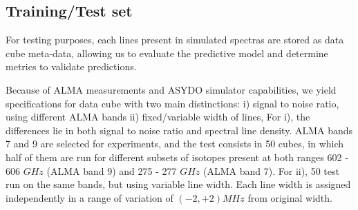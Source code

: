 \subsection{Training/Test set}
For testing purposes, each lines present in simulated spectras are stored as data cube meta-data, allowing us to evaluate the predictive model and determine metrics to validate predictions.

Because of ALMA measurements and ASYDO simulator capabilities, we yield specifications for data cube with two main distinctions:
i) signal to noise ratio, using different ALMA bands
ii) fixed/variable width of lines, 
For i), the differences lie in both signal to noise ratio and spectral line density.
ALMA bands 7 and 9 are selected for experiments, and the test consists in 50 cubes, in which half of them are run for different subsets of isotopes present at both ranges 602 - 606 $GHz$ (ALMA band 9) and 275 - 277 $GHz$ (ALMA band 7).
For ii), 50 test run on the same bands, but using variable line width.
Each line width is assigned independently in a range of variation of $(-2, +2) MHz$ from original width.


